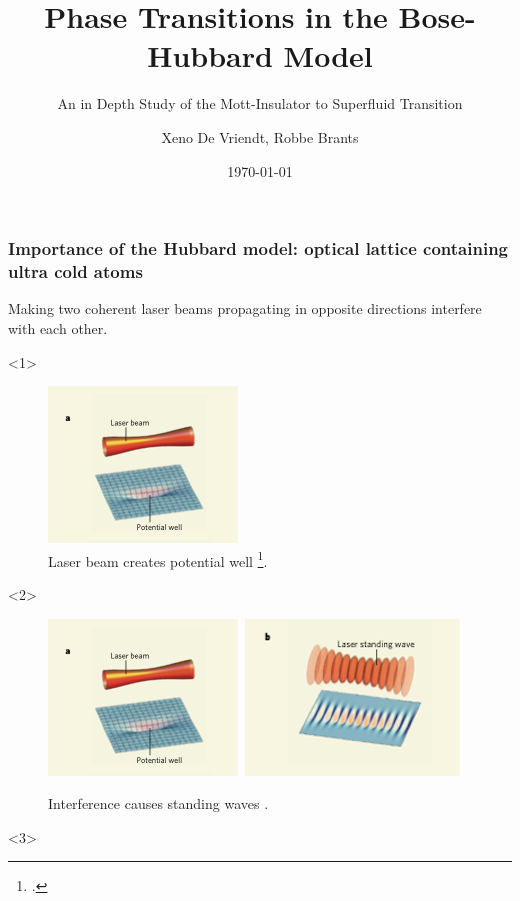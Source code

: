\documentclass[aspectratio=169]{beamer}
\title{Phase Transitions in the Bose-Hubbard Model}
\subtitle{An in Depth Study of the Mott-Insulator to Superfluid Transition}
\author[DB]{Xeno De Vriendt, Robbe Brants}
\date{\today}
\begin{document}
\titleframe

\begin{frame}
  \frametitle{Importance of the Hubbard model: optical lattice containing ultra cold atoms}
  Making two coherent laser beams propagating in opposite directions interfere with each other.
    \begin{onlyenv}<1>
      \begin{figure}
        \includegraphics[scale=0.5]{../img/Optical-lattice-creation-a.png}
        \caption{Laser beam creates potential well \footcite{Greiner2008}.}
      \end{figure}
    \end{onlyenv}
    \begin{onlyenv}<2>
      \begin{figure}
        \includegraphics[scale=0.5]{../img/Optical-lattice-creation-a.png} \includegraphics[scale=0.5]{../img/Optical-lattice-creation-b.png}
        \caption{Interference causes standing waves \footnotemark[1].}
      \end{figure} 
    \end{onlyenv}
    \begin{onlyenv}<3>
      \begin{figure}

\end{figure}
\end{onlyenv}
\end{frame}
\end{document}

